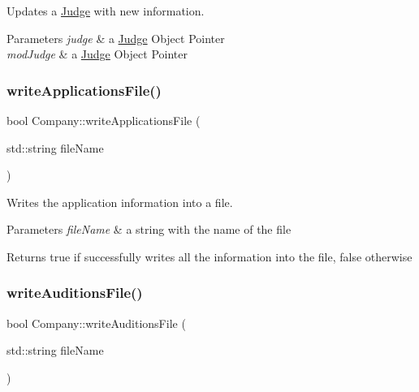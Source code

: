 Updates a \hyperlink{class_judge}{Judge} with new information. 


\begin{DoxyParams}{Parameters}
{\em judge} & a \hyperlink{class_judge}{Judge} Object Pointer \\
\hline
{\em mod\+Judge} & a \hyperlink{class_judge}{Judge} Object Pointer \\
\hline
\end{DoxyParams}
\mbox{\label{class_company_a4bdd95cb403430ae299259ac26721dde}} 
\subsubsection{\texorpdfstring{write\+Applications\+File()}{writeApplicationsFile()}}
{\footnotesize\ttfamily bool Company\+::write\+Applications\+File (\begin{DoxyParamCaption}\item[{std\+::string}]{file\+Name }\end{DoxyParamCaption})}



Writes the application information into a file. 


\begin{DoxyParams}{Parameters}
{\em file\+Name} & a string with the name of the file \\
\hline
\end{DoxyParams}
\begin{DoxyReturn}{Returns}
true if successfully writes all the information into the file, false otherwise 
\end{DoxyReturn}
\mbox{\label{class_company_afe265c202d76f371917835b5ce3f9184}} 
\subsubsection{\texorpdfstring{write\+Auditions\+File()}{writeAuditionsFile()}}
{\footnotesize\ttfamily bool Company\+::write\+Auditions\+File (\begin{DoxyParamCaption}\item[{std\+::string}]{file\+Name }\end{DoxyParamCaption})}



